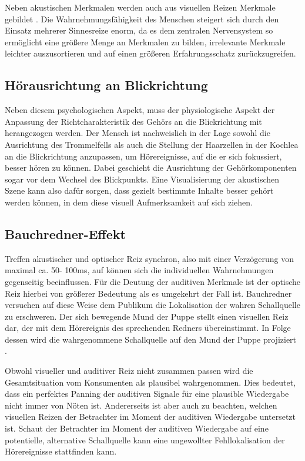 Neben akustischen Merkmalen werden auch aus visuellen Reizen Merkmale gebildet \cite[S.88]{HdA08}. Die Wahrnehmungsfähigkeit des Menschen steigert sich durch den Einsatz mehrerer Sinnesreize enorm, da es dem zentralen Nervensystem so ermöglicht eine größere Menge an Merkmalen zu bilden, irrelevante Merkmale leichter auszusortieren und auf einen größeren Erfahrungsschatz zurückzugreifen. \\ 

\subsection{Hörausrichtung an Blickrichtung}

Neben diesem psychologischen Aspekt, muss der physiologische Aspekt der Anpassung der Richtcharakteristik des Gehörs an die Blickrichtung mit herangezogen werden. Der Mensch ist nachweislich in der Lage sowohl die Ausrichtung des Trommelfells als auch die Stellung der Haarzellen in der Kochlea an die  Blickrichtung anzupassen, um Hörereignisse, auf die er sich fokussiert, besser hören zu können. Dabei geschieht die Ausrichtung der Gehörkomponenten sogar vor dem Wechsel des Blickpunkts\cite{Strick17}. Eine Visualisierung der akustischen Szene kann also dafür sorgen, dass gezielt bestimmte Inhalte besser gehört werden können, in dem diese visuell Aufmerksamkeit auf sich ziehen.  

\subsection{Bauchredner-Effekt}

Treffen akustischer und optischer Reiz synchron, also mit einer Verzögerung von maximal ca. 50- 100ms,  auf können sich die individuellen Wahrnehmungen gegenseitig beeinflussen. Für die Deutung der auditiven Merkmale ist der optische Reiz hierbei von größerer Bedeutung als es umgekehrt der Fall ist. Bauchredner versuchen auf diese Weise dem Publikum die Lokalisation der wahren Schallquelle zu erschweren. Der sich bewegende Mund der Puppe stellt einen visuellen Reiz dar, der mit dem Hörereignis des sprechenden Redners übereinstimmt. In Folge dessen wird die wahrgenommene Schallquelle auf den Mund der Puppe projiziert \cite[S.163]{Genuit10}.

Obwohl visueller und auditiver Reiz nicht zusammen passen wird die Gesamtsituation vom Konsumenten als plausibel wahrgenommen. Dies bedeutet, dass ein perfektes Panning der auditiven Signale für eine plausible Wiedergabe nicht immer von Nöten ist. Andererseits ist aber auch zu beachten, welchen visuellen Reizen der Betrachter im Moment der auditiven Wiedergabe untersetzt ist. Schaut der Betrachter im Moment der auditiven Wiedergabe auf eine potentielle, alternative Schallquelle  kann eine ungewollter Fehllokalisation der Hörereignisse stattfinden kann.


